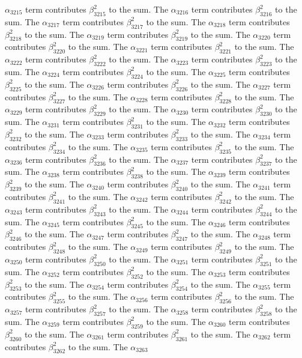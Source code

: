 \begin{lemma}
$\alpha_{3215}$ term contributes $\beta_{3215}^{2}$ to the sum. The $\alpha_{3216}$ term contributes $\beta_{3216}^{2}$ to the sum. The $\alpha_{3217}$ term contributes $\beta_{3217}^{2}$ to the sum. The $\alpha_{3218}$ term contributes $\beta_{3218}^{2}$ to the sum. The $\alpha_{3219}$ term contributes $\beta_{3219}^{2}$ to the sum. The $\alpha_{3220}$ term contributes $\beta_{3220}^{2}$ to the sum. The $\alpha_{3221}$ term contributes $\beta_{3221}^{2}$ to the sum. The $\alpha_{3222}$ term contributes $\beta_{3222}^{2}$ to the sum. The $\alpha_{3223}$ term contributes $\beta_{3223}^{2}$ to the sum. The $\alpha_{3224}$ term contributes $\beta_{3224}^{2}$ to the sum. The $\alpha_{3225}$ term contributes $\beta_{3225}^{2}$ to the sum. The $\alpha_{3226}$ term contributes $\beta_{3226}^{2}$ to the sum. The $\alpha_{3227}$ term contributes $\beta_{3227}^{2}$ to the sum. The $\alpha_{3228}$ term contributes $\beta_{3228}^{2}$ to the sum. The $\alpha_{3229}$ term contributes $\beta_{3229}^{2}$ to the sum. The $\alpha_{3230}$ term contributes $\beta_{3230}^{2}$ to the sum. The $\alpha_{3231}$ term contributes $\beta_{3231}^{2}$ to the sum. The $\alpha_{3232}$ term contributes $\beta_{3232}^{2}$ to the sum. The $\alpha_{3233}$ term contributes $\beta_{3233}^{2}$ to the sum. The $\alpha_{3234}$ term contributes $\beta_{3234}^{2}$ to the sum. The $\alpha_{3235}$ term contributes $\beta_{3235}^{2}$ to the sum. The $\alpha_{3236}$ term contributes $\beta_{3236}^{2}$ to the sum. The $\alpha_{3237}$ term contributes $\beta_{3237}^{2}$ to the sum. The $\alpha_{3238}$ term contributes $\beta_{3238}^{2}$ to the sum. The $\alpha_{3239}$ term contributes $\beta_{3239}^{2}$ to the sum. The $\alpha_{3240}$ term contributes $\beta_{3240}^{2}$ to the sum. The $\alpha_{3241}$ term contributes $\beta_{3241}^{2}$ to the sum. The $\alpha_{3242}$ term contributes $\beta_{3242}^{2}$ to the sum. The $\alpha_{3243}$ term contributes $\beta_{3243}^{2}$ to the sum. The $\alpha_{3244}$ term contributes $\beta_{3244}^{2}$ to the sum. The $\alpha_{3245}$ term contributes $\beta_{3245}^{2}$ to the sum. The $\alpha_{3246}$ term contributes $\beta_{3246}^{2}$ to the sum. The $\alpha_{3247}$ term contributes $\beta_{3247}^{2}$ to the sum. The $\alpha_{3248}$ term contributes $\beta_{3248}^{2}$ to the sum. The $\alpha_{3249}$ term contributes $\beta_{3249}^{2}$ to the sum. The $\alpha_{3250}$ term contributes $\beta_{3250}^{2}$ to the sum. The $\alpha_{3251}$ term contributes $\beta_{3251}^{2}$ to the sum. The $\alpha_{3252}$ term contributes $\beta_{3252}^{2}$ to the sum. The $\alpha_{3253}$ term contributes $\beta_{3253}^{2}$ to the sum. The $\alpha_{3254}$ term contributes $\beta_{3254}^{2}$ to the sum. The $\alpha_{3255}$ term contributes $\beta_{3255}^{2}$ to the sum. The $\alpha_{3256}$ term contributes $\beta_{3256}^{2}$ to the sum. The $\alpha_{3257}$ term contributes $\beta_{3257}^{2}$ to the sum. The $\alpha_{3258}$ term contributes $\beta_{3258}^{2}$ to the sum. The $\alpha_{3259}$ term contributes $\beta_{3259}^{2}$ to the sum. The $\alpha_{3260}$ term contributes $\beta_{3260}^{2}$ to the sum. The $\alpha_{3261}$ term contributes $\beta_{3261}^{2}$ to the sum. The $\alpha_{3262}$ term contributes $\beta_{3262}^{2}$ to the sum. The $\alpha_{3263}$ 
\end{lemma}
